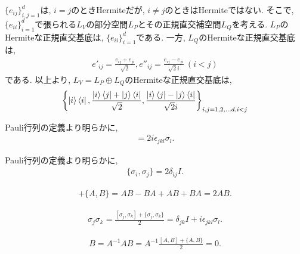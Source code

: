 \begin{ex}
    $\{e_{ij}\}_{i,j=1}^{d}$は, $i=j$のときHermiteだが, $i \neq j$のときはHermiteではない.
    そこで, $\{e_{ii}\}_{i=1}^{d}$で張られる$L_V$の部分空間$L_P$とその正規直交補空間$L_Q$を考える. $L_P$のHermiteな正規直交基底は, $\{e_{ii}\}_{i=1}^{d}$である. 一方, $L_Q$のHermiteな正規直交基底は,
    \begin{align*}
        e'_{ij} = \frac{e_{ij} + e_{ji}}{\sqrt{2}},
        e''_{ij} = \frac{e_{ij} - e_{ji}}{\sqrt{2}i} \ (i<j)
    \end{align*}
    である. 以上より, $L_V = L_P \oplus L_Q$のHermiteな正規直交基底は,
    \begin{align*}
        \left\{
        \ket{i} \bra{i}, \frac{\ket{i} \bra{j}+ \ket{j} \bra{i}}{\sqrt{2}}, \frac{\ket{i} \bra{j} - \ket{j} \bra{i}}{\sqrt{2}i}
        \right\}_{i,j = 1,2,\dots d , i < j}
    \end{align*}
\end{ex}

\begin{ex}
    \label{ex2.40}
    Pauli行列の定義より明らかに,
    \begin{align*}
        [\sigma_j , \sigma_k] = 2i \epsilon_{jkl} \sigma_l.
    \end{align*}
\end{ex}

\begin{ex}
    \label{ex2.41}
    Pauli行列の定義より明らかに,
    \begin{align*}
        \{ \sigma_i, \sigma_j \} = 2 \delta_{ij}I.
    \end{align*}
\end{ex}

\begin{ex}
    \label{ex2.42}
    \begin{align*}
        [A,B] + \{ A,B \} = AB - BA + AB + BA = 2AB.
    \end{align*}
\end{ex}

\begin{ex}
    \label{ex2.43}
    \begin{align*}
        \sigma_j \sigma_k
        =
        \frac{[\sigma_j,\sigma_k] + \{\sigma_j,\sigma_k \}}{2}
        =
        \delta_{jk} I + i \epsilon_{jkl} \sigma_l.
    \end{align*}
\end{ex}

\begin{ex}
    \label{ex2.44}
    \begin{align*}
        B = A^{-1} A B = A^{-1} \frac{ [A,B] + \{ A,B \} }{2} = 0.
    \end{align*}
\end{ex}

